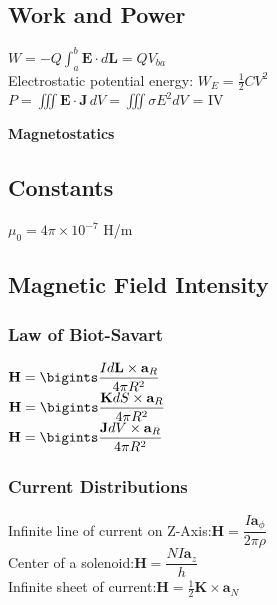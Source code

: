 \documentclass[12pt]{exam}
\begin{document}
\begin{multicols}{2}
\begin{flushleft}
	\subsection*{Work and Power}
	
	{ \addtolength{\leftskip}{0.5in}
		$W = -Q\int_a^b \mathbf{E}\cdot d\mathbf{L} = QV_{ba} $ \\[4pt]
		Electrostatic potential energy: $W_E =\frac{1}{2}CV^2$ \\[4pt]
		$P = \iiint \mathbf{E} \cdot \mathbf{J} \, dV = \iiint \sigma E^2 dV$ = IV \\[4pt]
	}
	
	\newpage
	\huge
	\textbf{Magnetostatics}
	\normalsize
	\vspace{0.2in}
	\subsection*{Constants}
	{ \addtolength{\leftskip}{0.5in}
		$ \mu_0 = 4\pi \times 10^{-7}$ H/m \\[4pt]
	}
	
	\subsection*{Magnetic Field Intensity}
	\vspace{0.1in}
	\subsubsection*{Law of Biot-Savart}
		\vspace{0.1in}
	{ \addtolength{\leftskip}{0.5in}
		$\mathbf{H} = \bigints \dfrac{I d \mathbf{L} \times \mathbf{a}_R}{4\pi R^2}$ \\[8pt]
		$\mathbf{H} = \bigints \dfrac{\mathbf{K}dS \times \mathbf{a}_R}{4\pi R^2}$ \\[8pt]
		$\mathbf{H} = \bigints \dfrac{\mathbf{J}dV \times \mathbf{a}_R}{4\pi R^2}$ \\[8pt]
	}
	
	\subsubsection*{Current Distributions}
			\vspace{0.1in}
	{ \addtolength{\leftskip}{0.5in}
		Infinite line of current on Z-Axis:\quad $\mathbf{H}  =\dfrac{I \mathbf{a}_\phi}{2\pi \rho}$\\[4pt]
		Center of a solenoid:\quad $\mathbf{H}  =\dfrac{NI \mathbf{a}_z}{h}$\\[4pt]
		Infinite sheet of current:\quad $\mathbf{H}  =\frac{1}{2}\mathbf{K} \times \mathbf{a}_N$\\[4pt]
	}
	

\end{flushleft}
\end{multicols}
\end{document}

